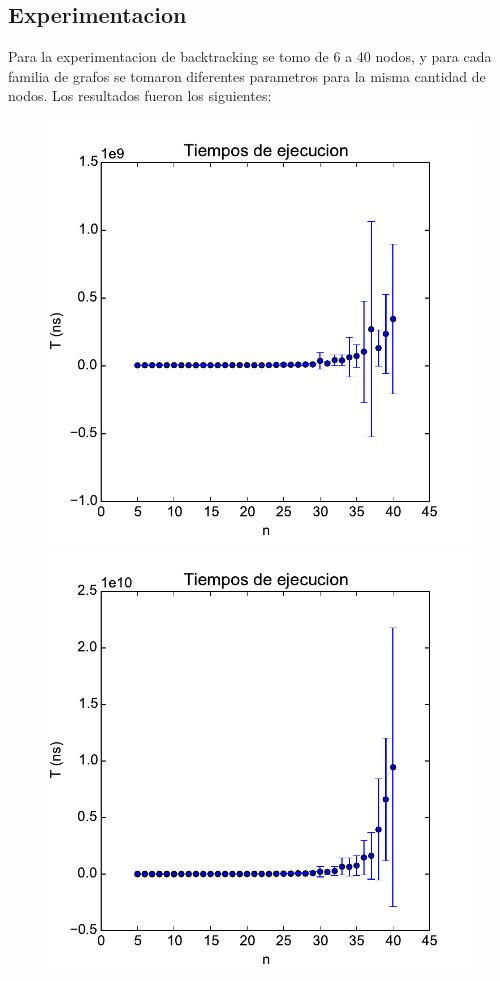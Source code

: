 \subsection{Experimentacion}

Para la experimentacion de backtracking se tomo de 6 a 40 nodos, y para cada familia de grafos se tomaron diferentes parametros para la misma cantidad de nodos. Los resultados fueron los siguientes:\\

\begin{figure}[ht]
\centering
	\includegraphics[scale=0.45]{images/graph_ej1/output_backtracking_1_n2}
	\includegraphics[scale=0.45]{images/graph_ej1/output_backtracking_1_n}

\end{figure}
